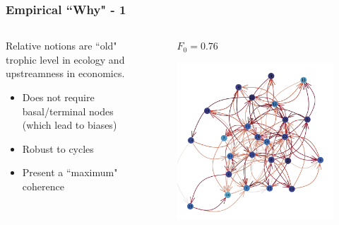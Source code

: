 \documentclass{beamer}
\begin{document}
\begin{frame}
\begin{columns}
\begin{column}{.49\textwidth}
\begin{figure}
            \end{figure}
        \end{column}
    \end{columns}
\end{frame}

\begin{frame}
    \frametitle{Empirical ``Why" - 1}
    \begin{columns}
        \begin{column}{.49\textwidth}
            Relative notions are ``old" trophic level in ecology
            and upstreamness in economics.
            \begin{itemize}
                \item Does not require basal/terminal nodes (which lead to biases)
                \item Robust to cycles
                \item Present a ``maximum" coherence
            \end{itemize}
        \end{column}
        \begin{column}{.49\textwidth}
            \begin{figure}
                \textbf{$F_0 = 0.76$}\par\medskip
                \includegraphics[width=\linewidth,height=\textheight,keepaspectratio]{../../plots/presentations/lv-network-big.png}
            \end{figure}
        \end{column}
    \end{columns}
\end{frame}
\end{document}
